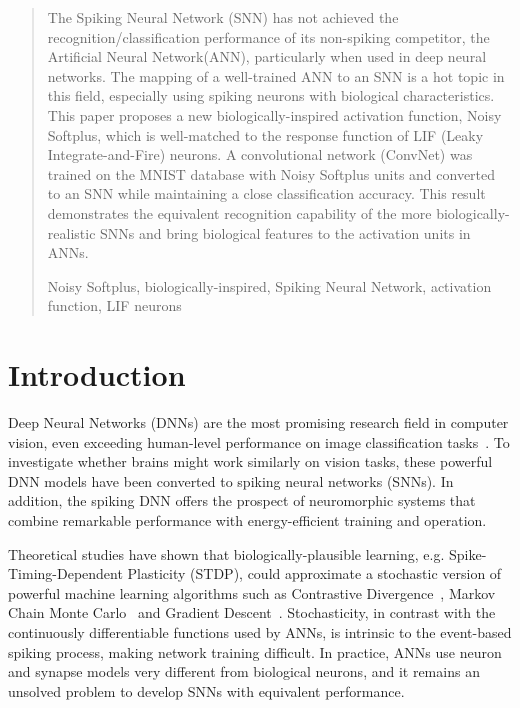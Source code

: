 \documentclass[runningheads,a4paper]{llncs}
\newcommand{\keywords}[1]{\par\addvspace\baselineskip
	\noindent\keywordname\enspace\ignorespaces#1}
\begin{document}
	
	\begin{abstract}
		The Spiking Neural Network (SNN) has not achieved the recognition/classification performance of its non-spiking competitor, the Artificial Neural Network(ANN), particularly when used in deep neural networks.
		The mapping of a well-trained ANN to an SNN is a hot topic in this field, especially using spiking neurons with biological characteristics.
		This paper proposes a new biologically-inspired activation function, Noisy Softplus, which is well-matched to the response function of LIF (Leaky Integrate-and-Fire) neurons.
		A convolutional network (ConvNet) was trained on the MNIST database with Noisy Softplus units and converted to an SNN while maintaining a close classification accuracy.
		This result demonstrates the equivalent recognition capability of the more biologically-realistic SNNs and bring biological features to the activation units in ANNs.
		\keywords{Noisy Softplus, biologically-inspired, Spiking Neural Network, activation function, LIF neurons}
	\end{abstract}
	
	\section{Introduction}
	
	Deep Neural Networks (DNNs) are the most promising research field in computer vision, even exceeding human-level performance on image classification tasks~\cite{he2015delving}.
	To investigate whether brains might work similarly on vision tasks, these powerful DNN models have been converted to spiking neural networks (SNNs).
	In addition, the spiking DNN offers the prospect of neuromorphic systems that combine remarkable performance with energy-efficient training and operation.
	
	Theoretical studies have shown that biologically-plausible learning, e.g. Spike-Timing-Dependent Plasticity (STDP), could approximate a stochastic version of powerful machine learning algorithms
	such as 
	Contrastive Divergence~\cite{neftci2013event}, Markov Chain Monte Carlo~\cite{buesing2011neural} and Gradient Descent~\cite{o2016deep}.
	Stochasticity, in contrast with the continuously differentiable functions used by ANNs, is intrinsic to the event-based spiking process, making network training difficult.
	In practice, ANNs use neuron and synapse models very different from biological neurons, and it remains an unsolved problem to develop SNNs with equivalent performance.
	
\end{document}
